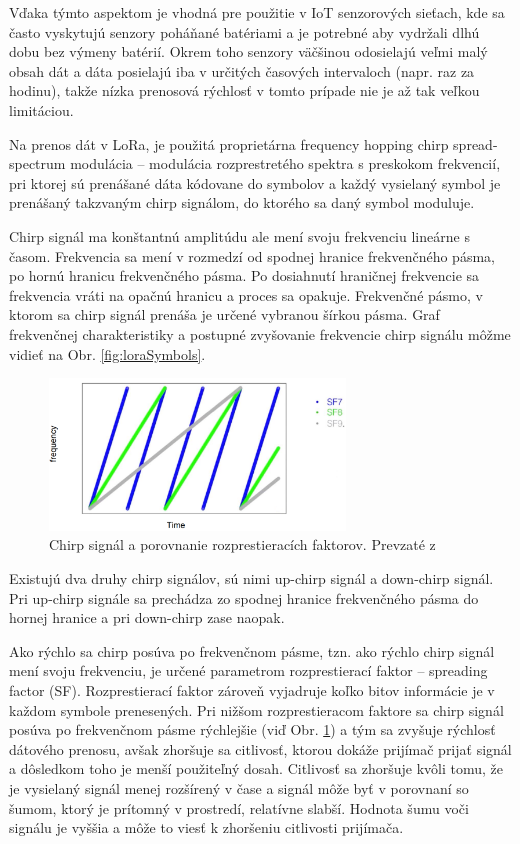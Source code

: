 \documentclass[slovak,master]{diploma}
\begin{document}
Vďaka týmto aspektom je vhodná pre použitie v IoT senzorových sieťach, kde sa často vyskytujú senzory poháňané batériami a je potrebné aby vydržali dlhú dobu 
bez výmeny batérií. Okrem toho senzory väčšinou odosielajú veľmi malý obsah dát a dáta posielajú iba v určitých časových intervaloch (napr. raz za hodinu), 
takže nízka prenosová rýchlosť v tomto prípade nie je až tak veľkou limitáciou.

Na prenos dát v LoRa, je použitá proprietárna frequency hopping chirp spread-spectrum modulácia -- modulácia rozprestretého spektra s preskokom frekvencií, pri ktorej sú prenášané dáta kódovane do symbolov 
a každý vysielaný symbol je prenášaný takzvaným chirp signálom, do ktorého sa daný symbol moduluje.

Chirp signál ma konštantnú amplitúdu ale mení svoju frekvenciu lineárne s časom. 
Frekvencia sa mení v rozmedzí od spodnej hranice frekvenčného pásma, po hornú hranicu frekvenčného pásma.
Po dosiahnutí hraničnej frekvencie sa frekvencia vráti na opačnú hranicu a proces sa opakuje.
Frekvenčné pásmo, v ktorom sa chirp signál prenáša je určené vybranou šírkou pásma.
Graf frekvenčnej charakteristiky a postupné zvyšovanie frekvencie chirp signálu môžme vidieť na Obr. \ref{fig:loraSymbols}.
\begin{figure}
	\centering
	\includegraphics[width=0.7\textwidth]{Figures/spreading factors.png}
	\caption[Porovnanie rozprestieracích faktorov]{Chirp signál a porovnanie rozprestieracích faktorov. Prevzaté z \cite{spreadfactorimage}}
	\label{fig:spreadingfactors}
\end{figure}

Existujú dva druhy chirp signálov, sú nimi up-chirp signál a down-chirp signál. Pri up-chirp signále sa prechádza zo spodnej hranice frekvenčného pásma do hornej hranice a pri 
down-chirp zase naopak.

\newpage
Ako rýchlo sa chirp posúva po frekvenčnom pásme, tzn. ako rýchlo chirp signál mení svoju frekvenciu, je určené parametrom rozprestierací faktor -- spreading factor (SF). 
Rozprestierací faktor zároveň vyjadruje koľko bitov informácie je v každom symbole prenesených. Pri nižšom rozprestieracom faktore sa chirp signál posúva po 
frekvenčnom pásme rýchlejšie (viď Obr. \ref{fig:spreadingfactors}) a tým sa zvyšuje rýchlosť dátového prenosu, 
avšak zhoršuje sa citlivosť, ktorou dokáže prijímač prijať signál a dôsledkom toho je menší použiteľný dosah. Citlivosť sa zhoršuje kvôli 
tomu, že je vysielaný signál menej rozšírený v čase a signál môže byť v porovnaní so šumom, ktorý je prítomný v prostredí, relatívne slabší. 
Hodnota šumu voči signálu je vyššia a môže to viesť k zhoršeniu citlivosti prijímača.
\end{document}
